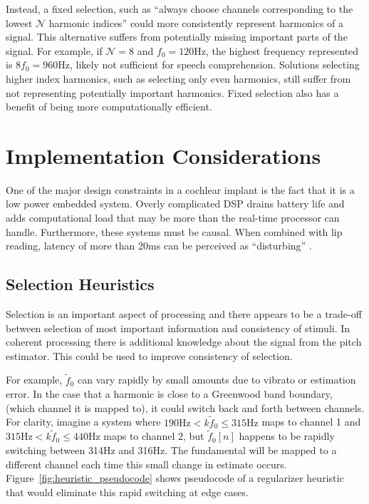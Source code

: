 \documentclass [11pt, proquest,oneside] {ganter_thesis}[2015/03/03]
\begin{document}
Instead, a fixed selection, such as ``always choose channels corresponding to the lowest $\mathcal{N}$ harmonic indices'' could more consistently represent harmonics of a signal.  This alternative suffers from potentially missing important parts of the signal.  For example, if $\mathcal{N} = 8$ and $f_0 = 120$Hz, the highest frequency represented is $8f_0 = 960$Hz, likely not sufficient for speech comprehension.  Solutions selecting higher index harmonics, such as selecting only even harmonics, still suffer from not representing potentially important harmonics.  Fixed selection also has a benefit of being more computationally efficient.


\section{Implementation Considerations}

One of the major design constraints in a cochlear implant is the fact that it is a low power embedded system.  Overly complicated DSP drains battery life and adds computational load that may be more than the real-time processor can handle.  Furthermore, these systems must be causal.  When combined with lip reading, latency of more than 20ms can be perceived as ``disturbing'' \cite{stone2002tolerable}.

\subsection{Selection Heuristics}

Selection is an important aspect of processing and there appears to be a trade-off between selection of most important information and consistency of stimuli.  In coherent processing there is additional knowledge about the signal from the pitch estimator.  This could be used to improve consistency of selection.

For example, $\tilde{f}_0$ can vary rapidly by small amounts due to vibrato or estimation error.  In the case that a harmonic is close to a Greenwood band boundary, (which channel it is mapped to), it could switch back and forth between channels.  For clarity, imagine a system where $190\mathrm{Hz} < k\tilde{f}_0 \leq 315\mathrm{Hz}$ maps to channel 1 and $315\mathrm{Hz} < k\tilde{f}_0 \leq 440\mathrm{Hz}$ maps to channel 2, but $\tilde{f}_0[n]$ happens to be rapidly switching between 314Hz and 316Hz.  The fundamental will be mapped to a different channel each time this small change in estimate occurs.  Figure~\ref{fig:heuristic_pseudocode} shows pseudocode of a regularizer heuristic that would eliminate this rapid switching at edge cases.
\end{document}
